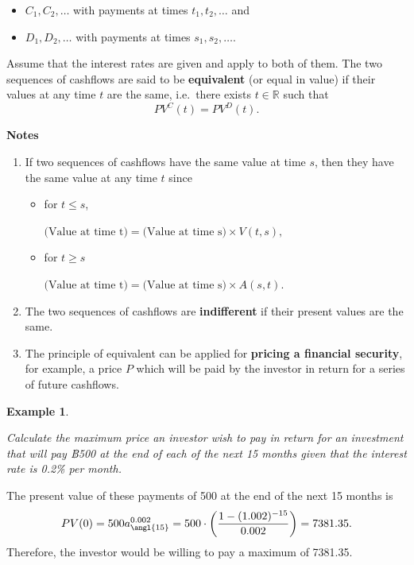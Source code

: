 \documentclass[landscape, 20pt]{extreport}
\theoremstyle{definition}
\theoremstyle{definition}
\newtheorem{example}{Example}[chapter]
\theoremstyle{definition}
\theoremstyle{definition}
\theoremstyle{remark}
\begin{document}
\begin{itemize}
\item
  \(C_1, C_2, \ldots\) with payments at times \(t_1, t_2, \ldots\) and
\item
  \(D_1, D_2, \ldots\) with payments at times \(s_1, s_2, \ldots\).
\end{itemize}

Assume that the interest rates are given and apply to both of them. The
two sequences of cashflows are said to be \textbf{equivalent} (or equal in
value) if their values at any time \(t\) are the same, i.e.~there exists
\(t \in \mathbb{R}\) such that \[PV^C(t)  = PV^D(t).\]

\textbf{Notes}

\begin{enumerate}
\def\labelenumi{\arabic{enumi}.}
\item
  If two sequences of cashflows have the same value at time \(s\), then
  they have the same value at any time \(t\) since

  \begin{itemize}
  \item
    for \(t \le s\),

    \(\text{(Value at time t)} = \text{(Value at time s)} \times V(t,s),\)
  \item
    for \(t \ge s\)

    \(\text{(Value at time t)} = \text{(Value at time s)} \times A(s,t).\)
  \end{itemize}
\item
  The two sequences of cashflows are \textbf{indifferent} if their present
  values are the same.
\item
  The principle of equivalent can be applied for \textbf{pricing a financial
  security}, for example, a price \(P\) which will be paid by the
  investor in return for a series of future cashflows.
\end{enumerate}

\newpage \begin{example}
\protect\hypertarget{exm:unlabeled-div-37}{}\label{exm:unlabeled-div-37}

\emph{Calculate the maximum price an investor wish to pay
in return for an investment that will pay ฿500 at the end of each of the
next 15 months given that the interest rate is 0.2\% per month.}

\end{example}

The present value of these payments of 500 at the end of the next 15
months is
\[PV(0) = 500 a^{0.002}_{\angl{15}} =  500 \cdot \left(  \frac{1 - (1.002)^{-15}}{0.002}  \right)   = 7381.35.\]
Therefore, the investor would be willing to pay a maximum of 7381.35.
\end{document}
